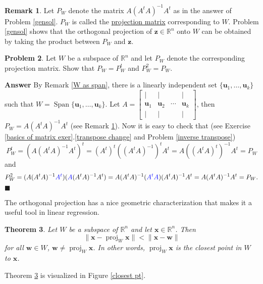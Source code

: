 \documentclass[12pt,letterpaper]{book}
\def\blue{\textcolor{blue}}
\numberwithin{equation}{section}
\newtheorem{thm}{\textbf{Theorem}}[section]
\theoremstyle{definition}
\newtheorem{problem}[thm]{\textbf{Problem}}
\newtheorem{remark}[thm]{\textbf{Remark}}
\newenvironment{answer}{\noindent\textbf{Answer}}{\hfill$\blacksquare$\vspace{0.1in}}
\newcommand{\vu}{\bm{u}}
\newcommand{\vw}{\bm{w}}
\newcommand{\vx}{\bm{x}}
\newcommand{\vz}{\bm{z}}
\newcommand{\Span}{\operatorname{Span}}
\begin{document}
\begin{remark}\label{projmat}
Let $P_W$ denote the matrix $A(A^tA)^{-1}A^t$ as in the answer of Problem \ref{gensol}. $P_W$ is called the \underline{projection matrix} corresponding to $W$. Problem \ref{gensol} shows that the orthogonal projection of $\vz\in \mathbb{R}^n$ onto $W$ can be obtained by taking the product between $P_W$ and $\vz$.
\end{remark}

\begin{problem}\label{proj matrix prop}
Let $W$ be a subspace of $\mathbb{R}^n$ and let $P_W$ denote the corresponding projection matrix. Show that $P_W=P_W^t$ and $P_W^2=P_W$.
\end{problem}

\begin{answer}
By Remark \ref{W as span}, there is a linearly independent set $\{\vu_1,\ldots,\vu_k\}$ such that $W=\Span\{\vu_1,\ldots,\vu_k\}$. Let $A=\left[\begin{array}{cccc} | & | &   & | \\ \vu_1 & \vu_2 & \cdots & \vu_k \\ | & | &  & | \end{array}\right]$, then $P_W=A(A^tA)^{-1}A^t$ (see Remark \ref{projmat}). Now it is easy to check that (see Exercise \ref{basics of matrix exer}.\ref{transpose change} and Problem \ref{inverse transpose})
$$P_W^t=(A(A^tA)^{-1}A^t)^t=(A^t)^t((A^tA)^{-1})^tA^t=A((A^tA)^t)^{-1}A^t=P_W$$
and
$$P_W^2=(A(A^tA)^{-1}\blue{A^t})(\blue{A}(A^tA)^{-1}A^t)=A(A^tA)^{-1}(\blue{A^tA})(A^tA)^{-1}A^t=A(A^tA)^{-1}A^t=P_W.$$
\end{answer}

The orthogonal projection has a nice geometric characterization that makes it a useful tool in linear regression.

\begin{thm}\label{closest thm}
Let $W$ be a subspace of $\mathbb{R}^n$ and let $\vx \in \mathbb{R}^n$. Then
$$\|\vx-\operatorname{proj}_W \vx\|< \|\vx-\vw\|$$
for all $\vw \in W$, $\vw\neq \operatorname{proj}_W \vx$. In other words, $\operatorname{proj}_W \vx$ is the closest point in $W$ to $\vx$.
\end{thm}

Theorem \ref{closest thm} is visualized in Figure \ref{closest pt}.
\end{document}
